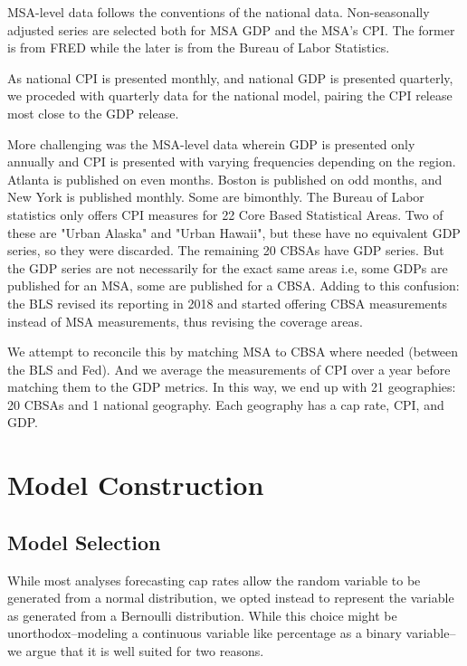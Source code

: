 MSA-level data follows the conventions of the national data. Non-seasonally adjusted series are selected both for MSA GDP and the MSA's CPI. The former is from FRED while the later is from the Bureau of Labor Statistics.

As national CPI is presented monthly, and national GDP is presented quarterly, we proceded with quarterly data for the national model, pairing the CPI release most close to the GDP release. 

More challenging was the MSA-level data wherein GDP is presented only annually and CPI is presented with varying frequencies depending on the region. Atlanta is published on even months. Boston is published on odd months, and New York is published monthly. Some are bimonthly. The Bureau of Labor statistics only offers CPI measures for 22 Core Based Statistical Areas. Two of these are "Urban Alaska" and "Urban Hawaii", but these have no equivalent GDP series, so they were discarded. The remaining 20 CBSAs have GDP series. But the GDP series are not necessarily for the exact same areas i.e, some GDPs are published for an MSA, some are published for a CBSA. Adding to this confusion: the BLS revised its reporting in 2018 and started offering CBSA measurements instead of MSA measurements, thus revising the coverage areas.

We attempt to reconcile this by matching MSA to CBSA where needed (between the BLS and Fed). And we average the measurements of CPI over a year before matching them to the GDP metrics. In this way, we end up with 21 geographies: 20 CBSAs and 1 national geography. Each geography has a cap rate, CPI, and GDP. 
 
\section{Model Construction}

\subsection{Model Selection}
While most analyses forecasting cap rates allow the random variable to be generated from a normal distribution, we opted instead to represent the variable as generated from a Bernoulli distribution. While this choice might be unorthodox--modeling a continuous variable like percentage as a binary variable-- we argue that it is well suited for two reasons. 

